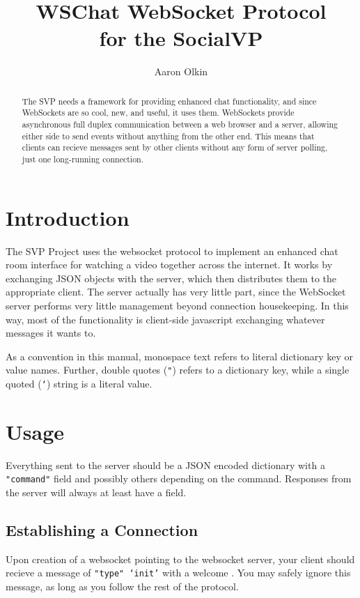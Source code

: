 \documentclass[12pt,letterpaper]{article}
\begin{document}
\title{WSChat WebSocket Protocol\\for the SocialVP}
\author{Aaron Olkin}
\maketitle
\vfill
\begin{abstract}
The SVP needs a framework for providing enhanced chat functionality, and since WebSockets are so cool, new, and useful, it uses them. WebSockets provide asynchronous full duplex communication between a web browser and a server, allowing either side to send events without anything from the other end. This means that clients can recieve messages sent by other clients without any form of server polling, just one long-running connection.
\end{abstract}
\clearpage

\section{Introduction}
The SVP Project uses the websocket protocol to implement an enhanced chat room interface for watching a video together across the internet. It works by exchanging JSON objects with the server, which then distributes them to the appropriate client. The server actually has very little part, since the WebSocket server performs very little management beyond connection housekeeping. In this way, most of the functionality is client-side javascript exchanging whatever messages it wants to.

As a convention in this manual, monospace text refers to literal dictionary key or value names. Further, double quotes (\texttt{"}) refers to a dictionary key, while a single quoted (\texttt{`}) string is a literal value.

\section{Usage}
Everything sent to the server should be a JSON encoded dictionary with a \texttt{"command"} field and possibly others depending on the command. Responses from the server will always at least have a \tttype  field.

\subsection{Establishing a Connection}
Upon creation of a websocket pointing to the websocket server, your client should recieve a message of \texttt{"type" `init'} with a welcome \ttmessage. You may safely ignore this message, as long as you follow the rest of the protocol.
\end{document}
